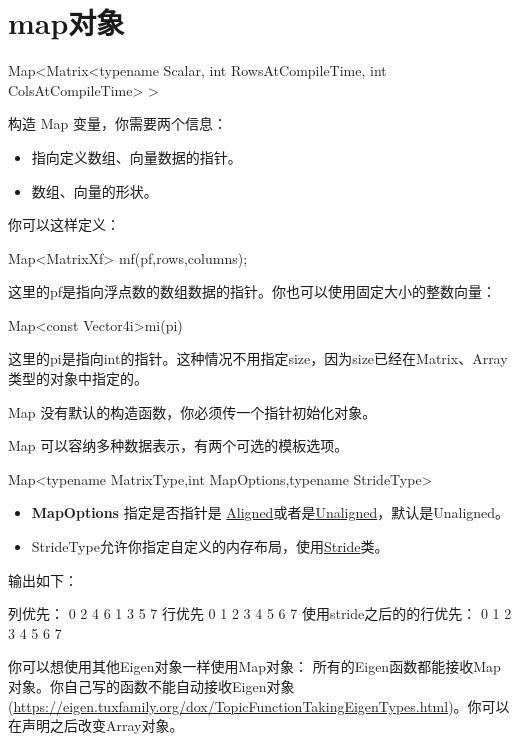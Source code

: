 \section{map对象}
\begin{cpp}
Map<Matrix<typename Scalar, int RowsAtCompileTime, int ColsAtCompileTime> >
\end{cpp}
构造 Map 变量，你需要两个信息：
\begin{itemize}
\item 指向定义数组、向量数据的指针。
\item 数组、向量的形状。
\end{itemize}
你可以这样定义：
\begin{cpp}
Map<MatrixXf> mf(pf,rows,columns);
\end{cpp}
这里的pf是指向浮点数的数组数据的指针。你也可以使用固定大小的整数向量：
\begin{cpp}
Map<const Vector4i>mi(pi)
\end{cpp}
这里的pi是指向int的指针。这种情况不用指定size，因为size已经在Matrix、Array类型的对象中指定的。
\begin{remark}
Map 没有默认的构造函数，你必须传一个指针初始化对象。
\end{remark}
Map 可以容纳多种数据表示，有两个可选的模板选项。
\begin{cpp}
Map<typename MatrixType,int MapOptions,typename StrideType>
\end{cpp}
\begin{itemize}
\item \textbf{MapOptions} 指定是否指针是 \href{https://eigen.tuxfamily.org/dox/group__enums.html#gga45fe06e29902b7a2773de05ba27b47a1ae12d0f8f869c40c76128260af2242bc8}{Aligned}或者是\href{https://eigen.tuxfamily.org/dox/group__enums.html#gga45fe06e29902b7a2773de05ba27b47a1a4e19dd09d5ff42295ba1d72d12a46686}{Unaligned}，默认是Unaligned。
\item StrideType允许你指定自定义的内存布局，使用\href{https://eigen.tuxfamily.org/dox/classEigen_1_1Stride.html}{Stride}类。
\end{itemize}
输出如下：
\begin{bash}
列优先：
0 2 4 6
1 3 5 7
行优先
0 1 2 3
4 5 6 7
使用stride之后的的行优先：
0 1 2 3
4 5 6 7
\end{bash}
你可以想使用其他Eigen对象一样使用Map对象：
所有的Eigen函数都能接收Map对象。你自己写的函数不能自动接收Eigen对象(\href{接收Eigen参数}{https://eigen.tuxfamily.org/dox/TopicFunctionTakingEigenTypes.html})。你可以在声明之后改变Array对象。

